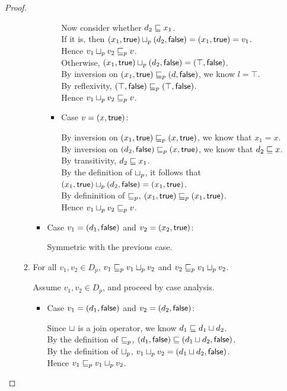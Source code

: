\begin{proof}
\begin{enumerate}
\begin{enumerate}
\begin{itemize}
\begin{itemize}
       Now consider whether $d_2 \sqsubseteq x_1$. \\
       If it is, then $(x_1, \textsf{true})  \sqcup_p  (d_2, \textsf{false}) = (x_1, \textsf{true}) = v_1$. \\ 
       Hence $v_1 \sqcup_p v_2 \sqsubseteq_p v$. \\ 
       Otherwise, $(x_1, \textsf{true})  \sqcup_p  (d_2, \textsf{false}) = (\top, \textsf{false})$. \\ 
       By inversion on $(x_1, \textsf{true}) \sqsubseteq_p (d, \textsf{false})$, we know $l = \top$. \\
       By reflexivity, $(\top, \textsf{false}) \sqsubseteq_p (\top, \textsf{false})$. \\ 
       Hence $v_1 \sqcup_p v_2 \sqsubseteq_p v$. 
       
     \item Case $v = (x, \textsf{true})$:  
  
       By inversion on $(x_1, \textsf{true}) \sqsubseteq_p (x, \textsf{true})$, we know that $x_1 = x$. \\ 
       By inversion on $(d_2, \textsf{false}) \sqsubseteq_p (x, \textsf{true})$, we know that $d_2 \sqsubseteq x$. \\ 
       By transitivity, $d_2 \sqsubseteq x_1$. \\ 
       By the definition of $ \sqcup_p $, it follows that $(x_1, \textsf{true})  \sqcup_p  (d_2, \textsf{false}) = (x_1, \textsf{true})$. \\ 
       By defininition of $\sqsubseteq_p$, $(x_1, \textsf{true}) \sqsubseteq_p (x_1, \textsf{true})$. \\ 
       Hence $v_1 \sqcup_p v_2 \sqsubseteq_p v$. 
     \end{itemize}
  
   \item Case $v_1 = (d_1, \textsf{false})$ and $v_2 = (x_2, \textsf{true})$: 
  
     Symmetric with the previous case. 
   \end{itemize}
 \item For all $v_1, v_2 \in D_p$, $v_1 \sqsubseteq_p v_1 \sqcup_p v_2$ and $v_2 \sqsubseteq_p v_1 \sqcup_p v_2$.
    
    Assume $v_1, v_2 \in D_p$, and proceed by case analysis. 
    \begin{itemize}
      \item Case $v_1 = (d_1, \textsf{false})$ and $v_2 = (d_2, \textsf{false})$:

        Since $ \sqcup $ is a join operator, we know $d_1 \sqsubseteq d_1 \sqcup d_2$.\\
        By the definition of $\sqsubseteq_p$, $(d_1, \textsf{false}) \sqsubseteq (d_1 \sqcup d_2, \textsf{false})$.\\
        By the definition of $ \sqcup_p $, $v_1 \sqcup_p v_2 = (d_1 \sqcup d_2, \textsf{false})$.\\
        Hence $v_1 \sqsubseteq_p v_1 \sqcup_p v_2$.  \\


\end{itemize}
\end{enumerate}
\end{enumerate}
\end{proof}
